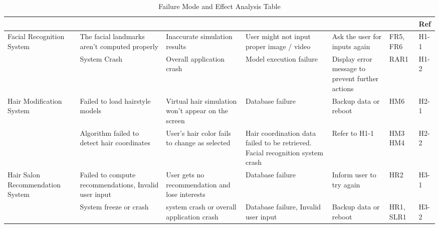 \documentclass{article}
\begin{document}
\begin{landscape}
\begin{table}[h!]
\def\arraystretch{1.7}
\begin{tabularx}{1.2\textwidth} { |X|X|X|X|X
  | p{0.9cm}
  | p{0.9cm} | }
\hline
	\centering{Component} & \centering{Failure Mode} & \centering{Effects of Failure} & \centering{Causes of Failure} & \centering{Recommended Action} & \centering{SR} & Ref \\ \hline
    Facial Recognition System & The facial landmarks aren't computed properly & Inaccurate simulation results & User might not input proper image / video & Ask the user for inputs again & FR5, FR6 & H1-1 \\ \cline{2-7}
     & System Crash & Overall application crash & Model execution failure & Display error message to prevent further actions & RAR1 & H1-2 \\ \hline
     
     Hair Modification System & Failed to load hairstyle models & Virtual hair simulation won't appear on the screen  & Database failure & Backup data or reboot & HM6  & H2-1 \\  \cline{2-7}
     
     ~ & Algorithm failed to detect hair coordinates  & User's hair color fails to change as selected  &  
     Hair coordination data failed to be retrieved. \newline 
     Facial recognition system crash
     & Refer to H1-1 & HM3 \newline HM4 & H2-2 \\ \hline
     
     Hair Salon Recommendation System & Failed to compute recommendations, Invalid user input & User gets no recommendation and lose interests & Database failure & Inform user to try again & HR2 & H3-1 \\ \cline{2-7}
     ~ & System freeze or crash & system crash or overall application crash & Database failure, Invalid user input & Backup data or reboot & HR1, SLR1 & H3-2 \\ \hline
     

\end{tabularx}
\caption{Failure Mode and Effect Analysis Table}
\label{FMEA Table}
\end{table}
\end{landscape}


\newpage
\end{document}
